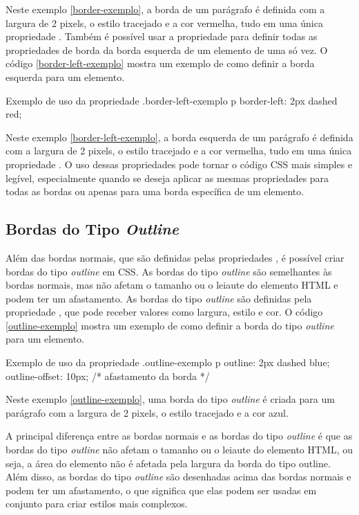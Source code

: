 Neste exemplo \ref{border-exemplo}, a borda de um parágrafo é definida com a largura de 2 pixels, o estilo tracejado e a cor vermelha, tudo em uma única propriedade . Também é possível usar a propriedade  para definir todas as propriedades de borda da borda esquerda de um elemento de uma só vez. O código \ref{border-left-exemplo} mostra um exemplo de como definir a borda esquerda para um elemento.

\begin{csscode}{Exemplo de uso da propriedade .}{border-left-exemplo}
p {
    border-left: 2px dashed red;
}
\end{csscode}

Neste exemplo \ref{border-left-exemplo}, a borda esquerda de um parágrafo é definida com a largura de 2 pixels, o estilo tracejado e a cor vermelha, tudo em uma única propriedade . O uso dessas propriedades pode tornar o código CSS mais simples e legível, especialmente quando se deseja aplicar as mesmas propriedades para todas as bordas ou apenas para uma borda específica de um elemento.

\subsection{Bordas do Tipo \textit{Outline}}

Além das bordas normais, que são definidas pelas propriedades , é possível criar bordas do tipo \textit{outline} em CSS. As bordas do tipo \textit{outline} são semelhantes às bordas normais, mas não afetam o tamanho ou o leiaute do elemento HTML e podem ter um afastamento. As bordas do tipo \textit{outline} são definidas pela propriedade , que pode receber valores como largura, estilo e cor. O código \ref{outline-exemplo} mostra um exemplo de como definir a borda do tipo \textit{outline} para um elemento.

\begin{csscode}{Exemplo de uso da propriedade .}{outline-exemplo}
p {
    outline: 2px dashed blue;
    outline-offset: 10px; /* afastamento da borda */
}
\end{csscode}

Neste exemplo \ref{outline-exemplo}, uma borda do tipo \textit{outline} é criada para um parágrafo com a largura de 2 pixels, o estilo tracejado e a cor azul.

A principal diferença entre as bordas normais e as bordas do tipo \textit{outline} é que as bordas do tipo \textit{outline} não afetam o tamanho ou o leiaute do elemento HTML, ou seja, a área do elemento não é afetada pela largura da borda do tipo outline. Além disso, as bordas do tipo \textit{outline} são desenhadas acima das bordas normais e podem ter um afastamento, o que significa que elas podem ser usadas em conjunto para criar estilos mais complexos.

